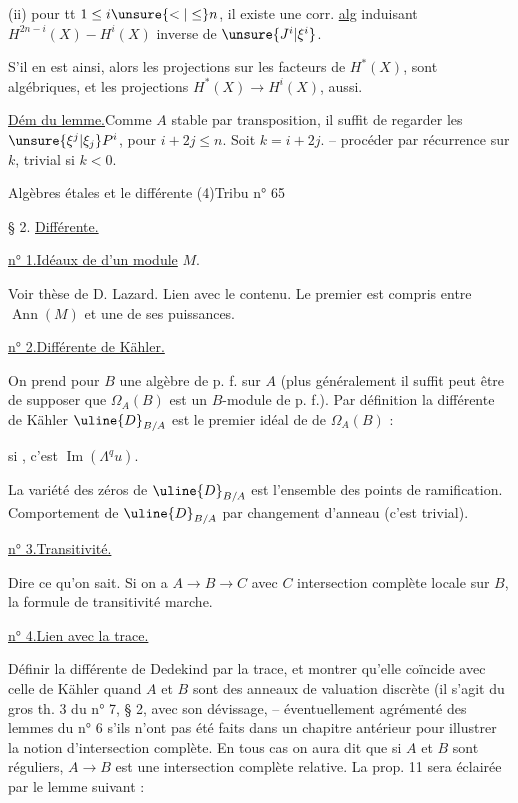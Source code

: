 (ii) pour tt $1\leq i\unsure{<|\leq}n$, il existe une corr. \uline{alg} induisant $H^{2n-i}(X)\mathrel{-}H^i(X)$ inverse de $\unsure{J^i|\xi^i}$.

 S'il en est ainsi, alors les \deleted{$\unsure{\xi}$} projections sur les facteurs  de $H^*(X)$, sont algébriques, et les projections $H^*(X)\to H^i(X)$, aussi.

\uline{Dém du lemme.}\quad Comme $A$ stable par transposition, il suffit de regarder les $\unsure{\xi^j|\xi_j}P^i$, pour $i+2j\leq n$. Soit $k=i+2j$. -- procéder par récurrence sur $k$, trivial si $k<0$.



Algèbres étales et le différente (4)\hfill Tribu n° 65

§ 2. \uline{Différente.}

\uline{n° 1.}\quad \uline{Idéaux de  d'un module} $M$.

Voir thèse de D. Lazard. Lien avec le contenu. Le premier  est compris entre $\operatorname{Ann}(M)$ et une de ses puissances.

\uline{n° 2.}\quad \uline{Différente de Kähler.}

On prend pour $B$ une algèbre de p. f. sur $A$ (plus généralement il suffit peut être de supposer que $\Omega_A(B)$ est un $B$-module de p. f.). Par définition la différente de Kähler $\uline{D}_{B/A}$ est le premier idéal de  de $\Omega_A(B)$ :
\margin{\unsure{!}}

si
, c'est $\operatorname{Im}(\Lambda^q u)$.

La variété des zéros de $\uline{D}_{B/A}$ est l'ensemble des points de ramification. Comportement de $\uline{D}_{B/A}$ par changement d'anneau (c'est trivial).

\uline{n° 3.}\quad \uline{Transitivité.}

Dire ce qu'on sait. Si on a $A\to B\to C$ avec $C$ intersection complète locale sur $B$, la formule de transitivité marche.

\uline{n° 4.}\quad \uline{Lien avec la trace.}

Définir la différente de Dedekind par la trace, et montrer qu'elle coïncide avec celle de Kähler quand $A$ et $B$ sont des anneaux de valuation discrète (il s'agit du gros th. 3 du n° 7, § 2, avec son dévissage, -- éventuellement agrémenté des lemmes du n° 6 s'ils n'ont pas été faits dans un chapitre antérieur pour illustrer la notion d'intersection complète. En tous cas on aura dit que si $A$ et $B$ sont réguliers, $A\to B$ est une intersection complète relative. La prop. 11 sera éclairée par le lemme suivant :

